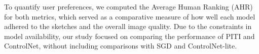 To quantify user preferences, we computed the Average Human Ranking (AHR) for both metrics, which served as a comparative measure of how well each model adhered to the sketches and the overall image quality. Due to the constraints in model availability, our study focused on comparing the performance of PITI and ControlNet, without including comparisons with SGD and ControlNet-lite.
